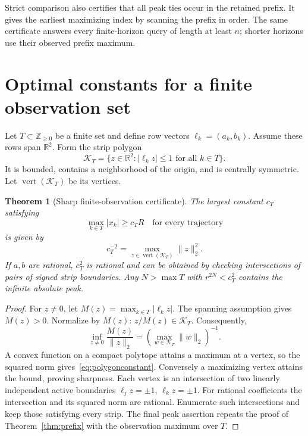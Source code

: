 \documentclass[11pt,a4paper]{article}
\newtheorem{theorem}{Theorem}\newtheorem{proposition}[theorem]{Proposition}\newtheorem{lemma}[theorem]{Lemma}\newtheorem{corollary}[theorem]{Corollary}\theoremstyle{definition}\newtheorem{definition}[theorem]{Definition}\newtheorem{example}[theorem]{Example}
\newcommand{\R}{\mathbb R}\newcommand{\C}{\mathbb C}\newcommand{\Z}{\mathbb Z}\newcommand{\N}{\mathbb N}\newcommand{\ip}[2]{\langle #1,#2\rangle}\newcommand{\norm}[1]{\lVert #1\rVert}\newcommand{\one}{\mathbf 1}
\begin{document}
Strict comparison also certifies that all peak ties occur in the retained
prefix. It gives the earliest maximizing index by scanning the prefix in
order. The same certificate answers every finite-horizon query of length
at least $n$; shorter horizons use their observed prefix maximum.

\section{Optimal constants for a finite observation set}
Let $T\subset\Z_{\ge0}$ be a finite set and define row vectors
$\ell_k=(a_k,b_k)$. Assume these rows span $\R^2$.
Form the strip polygon
\begin{equation}\label{eq:polygon}
 \mathcal K_T=\{z\in\R^2:|\ell_kz|\le1\text{ for all }k\in T\}.
\end{equation}
It is bounded, contains a neighborhood of the origin, and is centrally
symmetric. Let $\operatorname{vert}(\mathcal K_T)$ be its vertices.

\begin{theorem}[Sharp finite-observation certificate]\label{thm:polygon}
The largest constant $c_T$ satisfying
\[
 \max_{k\in T}|x_k|\ge c_T R\quad\text{for every trajectory}
\]
is given by
\begin{equation}\label{eq:polygonconstant}
 \boxed{c_T^{-2}=\max_{z\in\operatorname{vert}(\mathcal K_T)}\norm z_2^2.}
\end{equation}
If $a,b$ are rational, $c_T^2$ is rational and can be obtained by checking
intersections of pairs of signed strip boundaries.
Any $N>\max T$ with $r^{2N}<c_T^2$ contains the infinite absolute peak.
\end{theorem}
\begin{proof}
For $z\ne0$, let $M(z)=\max_{k\in T}|\ell_kz|$.
The spanning assumption gives $M(z)>0$. Normalize by $M(z)$:
$z/M(z)\in\mathcal K_T$. Consequently,
\[
 \inf_{z\ne0}\frac{M(z)}{\norm z_2}
 =\left(\max_{w\in\mathcal K_T}\norm w_2\right)^{-1}.
\]
A convex function on a compact polytope attains a maximum at a vertex,
so the squared norm gives~\eqref{eq:polygonconstant}. Conversely a
maximizing vertex attains the bound, proving sharpness.
Each vertex is an intersection of two linearly independent active
boundaries $\ell_jz=\pm1$, $\ell_kz=\pm1$.
For rational coefficients the intersection and its squared norm are
rational. Enumerate such intersections and keep those satisfying every
strip. The final peak assertion repeats the proof of
Theorem~\ref{thm:prefix} with the observation maximum over $T$.
\end{proof}
\end{document}
